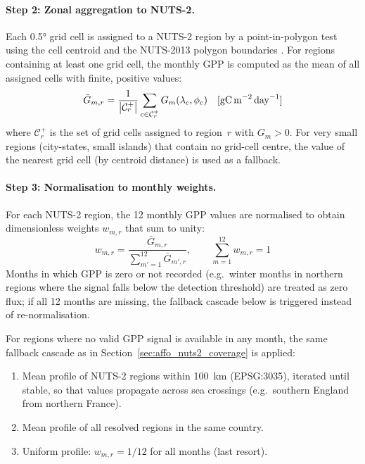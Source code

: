 \documentclass[12pt, a4paper]{article}
\begin{document}
\paragraph{Step 2: Zonal aggregation to NUTS-2.}
Each \ang{0.5} grid cell is assigned to a NUTS-2 region by a
point-in-polygon test using the cell centroid and the NUTS-2013 polygon
boundaries \citep{Eurostat2013NUTS}. For regions containing at least one
grid cell, the monthly GPP is computed as the mean of all assigned cells
with finite, positive values:
\begin{equation}
    \bar{G}_{m,r}
    = \frac{1}{\left|\mathcal{C}_r^+\right|}
      \sum_{c \in \mathcal{C}_r^+} G_m(\lambda_c, \phi_c)
    \quad [\text{gC\,m}^{-2}\,\text{day}^{-1}]
    \label{eq:gpp_zonal}
\end{equation}
where $\mathcal{C}_r^+$ is the set of grid cells assigned to region~$r$
with $G_m > 0$. For very small regions (city-states, small islands) that
contain no grid-cell centre, the value of the nearest grid cell (by centroid
distance) is used as a fallback.

\paragraph{Step 3: Normalisation to monthly weights.}
For each NUTS-2 region, the 12 monthly GPP values are normalised to obtain
dimensionless weights $w_{m,r}$ that sum to unity:
\begin{equation}
    w_{m,r} = \frac{\bar{G}_{m,r}}{\displaystyle\sum_{m'=1}^{12} \bar{G}_{m',r}},
    \qquad \sum_{m=1}^{12} w_{m,r} = 1
    \label{eq:gpp_weights}
\end{equation}
Months in which GPP is zero or not recorded (e.g.\ winter months in northern
regions where the signal falls below the detection threshold) are treated as
zero flux; if all 12 months are missing, the fallback cascade below is
triggered instead of re-normalisation.

For regions where no valid GPP signal is available in any month, the same
fallback cascade as in Section~\ref{sec:affo_nuts2_coverage} is applied:
\begin{enumerate}[leftmargin=2em]
    \item Mean profile of NUTS-2 regions within \SI{100}{km} (EPSG:3035),
          iterated until stable, so that values propagate across sea crossings
          (e.g.\ southern England from northern France).
    \item Mean profile of all resolved regions in the same country.
    \item Uniform profile: $w_{m,r} = 1/12$ for all months (last resort).
\end{enumerate}
\end{document}
